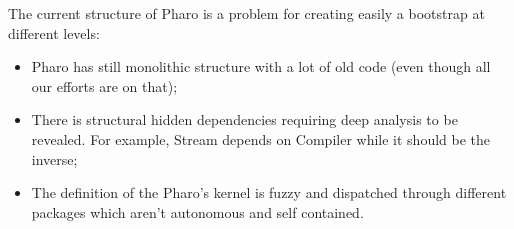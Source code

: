 The current structure of \gls{Pharo} is a problem for creating easily a bootstrap at different levels:
\begin{itemize}
	\item \gls{Pharo} has still monolithic structure with a lot of old code (even though all our efforts are on that);
	\item There is structural hidden dependencies requiring deep analysis to be revealed. For example, Stream depends on Compiler while it should be the inverse;
	\item The definition of the \gls{Pharo}'s kernel is fuzzy and dispatched through different packages which aren't autonomous and self contained.
\end{itemize}